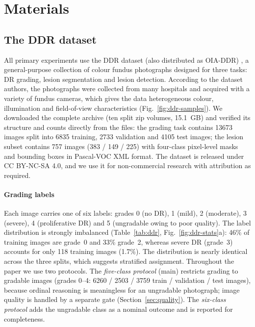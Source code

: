\section{Materials}
\label{sec:data}

\subsection{The DDR dataset}
\label{sec:ddr}
All primary experiments use the DDR dataset (also distributed as OIA-DDR) \citep{li2019ddr}, a general-purpose collection of colour fundus photographs designed for three tasks: DR grading, lesion segmentation and lesion detection. According to the dataset authors, the photographs were collected from many hospitals and acquired with a variety of fundus cameras, which gives the data heterogeneous colour, illumination and field-of-view characteristics (Fig.~\ref{fig:ddr-samples}). We downloaded the complete archive (ten split zip volumes, 15.1~GB) and verified its structure and counts directly from the files: the grading task contains \num{13673} images split into 6835 training, 2733 validation and 4105 test images; the lesion subset contains 757 images (383 / 149 / 225) with four-class pixel-level masks and bounding boxes in Pascal-VOC XML format. The dataset is released under CC BY-NC-SA 4.0, and we use it for non-commercial research with attribution as required.

\paragraph{Grading labels} Each image carries one of six labels: grades 0 (no DR), 1 (mild), 2 (moderate), 3 (severe), 4 (proliferative DR) and 5 (ungradable owing to poor quality). The label distribution is strongly imbalanced (Table~\ref{tab:ddr}, Fig.~\ref{fig:ddr-stats}a): 46\% of training images are grade~0 and 33\% grade~2, whereas severe DR (grade~3) accounts for only 118 training images (1.7\%). The distribution is nearly identical across the three splits, which suggests stratified assignment. Throughout the paper we use two protocols. The \emph{five-class protocol} (main) restricts grading to gradable images (grades 0--4: 6260 / 2503 / 3759 train / validation / test images), because ordinal reasoning is meaningless for an ungradable photograph; image quality is handled by a separate gate (Section~\ref{sec:quality}). The \emph{six-class protocol} adds the ungradable class as a nominal outcome and is reported for completeness.

